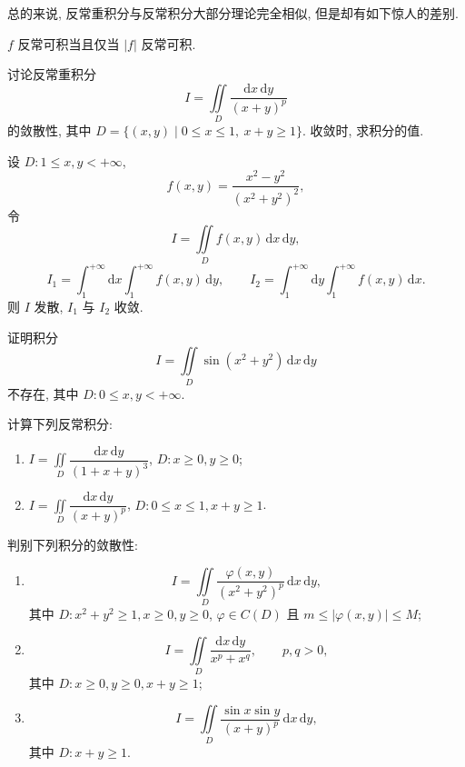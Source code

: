 \documentclass[../../数学分析培优讲义.tex]{subfiles}
\begin{document}
总的来说, 反常重积分与反常积分大部分理论完全相似, 但是却有如下惊人的差别.

\begin{theorem}[\markstar]
$f$ 反常可积当且仅当 $|f|$ 反常可积.
\end{theorem}

\begin{example}
讨论反常重积分
\[
    I=\iint\limits_D\dfrac{\mathrm{d}x\,\mathrm{d}y}{(x+y)^p}
\]
的敛散性, 其中 $D=\{(x,y)\mid0\leq x\leq1,\ x+y\geq1\}$. 收敛时, 求积分的值.
\end{example}
\exampleblank

\begin{example}
设 $D:1\leq x,y<+\infty$,
\[
    f(x,y)=\dfrac{x^2-y^2}{(x^2+y^2)^2},
\]
令
\[
    I=\iint\limits_Df(x,y)\,\mathrm{d}x\,\mathrm{d}y,
\]
\[
    I_1=\int_1^{+\infty}\mathrm{d}x\int_1^{+\infty}f(x,y)\,\mathrm{d}y,
    \qquad
    I_2=\int_1^{+\infty}\mathrm{d}y\int_1^{+\infty}f(x,y)\,\mathrm{d}x.
\]
则 $I$ 发散, $I_1$ 与 $I_2$ 收敛.
\end{example}
\exampleblank

\begin{example}
证明积分
\[
    I=\iint\limits_D\sin(x^2+y^2)\,\mathrm{d}x\,\mathrm{d}y
\]
不存在, 其中 $D:0\leq x,y<+\infty$.
\end{example}
\exampleblank

\begin{example}
计算下列反常积分:
\begin{enumerate}[label=(\arabic*)]
    \item $\displaystyle I=\iint\limits_D\dfrac{\mathrm{d}x\,\mathrm{d}y}{(1+x+y)^3}$, $D:x\geq0,y\geq0$;
    \item $\displaystyle I=\iint\limits_D\dfrac{\mathrm{d}x\,\mathrm{d}y}{(x+y)^p}$, $D:0\leq x\leq1,x+y\geq1$.
\end{enumerate}
\end{example}
\exampleblank

\begin{example}
判别下列积分的敛散性:
\begin{enumerate}[label=(\arabic*)]
    \item
    \[
        I=\iint\limits_D\dfrac{\varphi(x,y)}{(x^2+y^2)^p}\,\mathrm{d}x\,\mathrm{d}y,
    \]
    其中 $D:x^2+y^2\geq1,x\geq0,y\geq0$, $\varphi\in C(D)$ 且 $m\leq|\varphi(x,y)|\leq M$;
    \item
    \[
        I=\iint\limits_D\dfrac{\mathrm{d}x\,\mathrm{d}y}{x^p+x^q},
        \qquad p,q>0,
    \]
    其中 $D:x\geq0,y\geq0,x+y\geq1$;
    \item
    \[
        I=\iint\limits_D\dfrac{\sin x\sin y}{(x+y)^p}\,\mathrm{d}x\,\mathrm{d}y,
    \]
    其中 $D:x+y\geq1$.
\end{enumerate}
\end{example}
\exampleblank
\end{document}
